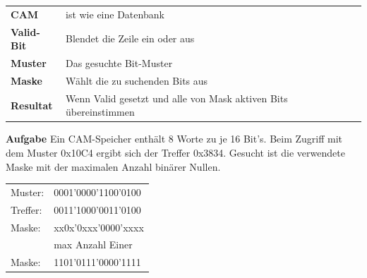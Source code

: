 \renewcommand{\arraystretch}{0.5}
\begin{tabular}{ll}
   \textbf{CAM}         & ist wie eine Datenbank\\
   \textbf{Valid-Bit}   & Blendet die Zeile ein oder aus\\
   \textbf{Muster}      & Das gesuchte Bit-Muster\\
   \textbf{Maske}       & Wählt die zu suchenden Bits aus\\
   \textbf{Resultat}    & Wenn Valid gesetzt und alle von Mask aktiven Bits übereinstimmen\\
\end{tabular}\newline
\textbf{Aufgabe}\newline
Ein CAM-Speicher enthält 8 Worte zu je 16 Bit's. Beim Zugriff mit dem Muster 0x10C4 ergibt sich der Treffer 0x3834.\newline
Gesucht ist die verwendete Maske mit der maximalen Anzahl binärer Nullen.\newline
\begin{tabular}{ll}
    Muster: & 0001'0000'1100'0100\\
    Treffer:& 0011'1000'0011'0100\\
    \hline
    Maske:  & xx0x'0xxx'0000'xxxx\\
    &max Anzahl Einer\\
    Maske:  & 1101'0111'0000'1111\\  
\end{tabular}
\renewcommand{\arraystretch}{1}
\newline


